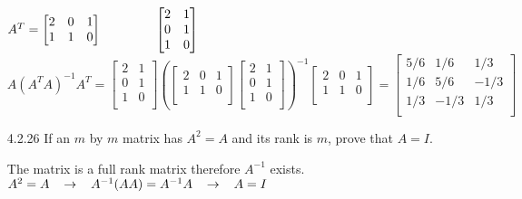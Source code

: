 \documentclass[10pt,twoside,reqno]{article}
\begin{document}
\begin{enumerate}
\vspace{3mm}
\begin{center}
$
A^T=
\begin{bmatrix}
2&0&1\\
1&1&0\\
\end{bmatrix}
\hspace{15mm}
\begin{bmatrix}
2&1\\
0&1\\
1&0\\
\end{bmatrix}
$ \\
$
A(A^TA)^{-1}A^T=
\begin{bmatrix}
2&1\\
0&1\\
1&0\\
\end{bmatrix}
\left(
\begin{bmatrix}
2&0&1\\
1&1&0\\
\end{bmatrix}
\begin{bmatrix}
2&1\\
0&1\\
1&0\\
\end{bmatrix}
\right)^{-1}
\begin{bmatrix}
2&0&1\\
1&1&0\\
\end{bmatrix}
=
\begin{bmatrix}
5/6&1/6&1/3\\
1/6&5/6&-1/3\\
1/3&-1/3&1/3\\
\end{bmatrix}
$
\end{center}
\vspace{3mm}
\item[4.2.26] If an $m$ by $m$ matrix has $A^2 = A$ and its rank is $m$, prove that $A = I$. \\
\vspace{3mm}
\begin{center}
The matrix is a full rank matrix therefore $A^{-1}$ exists. \\
$A^2=A \hspace{3mm} \rightarrow \hspace{3mm} A^{-1}(AA)=A^{-1}A \hspace{3mm} \rightarrow \hspace{3mm} A=I$ \\

\end{center}
\end{enumerate}
\end{document}
